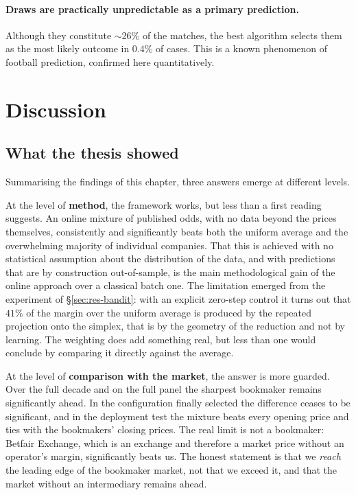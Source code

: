 \documentclass[12pt,a4paper,oneside]{report}
\renewcommand{\_}{\oldunderscore\allowbreak}
\theoremstyle{definition}
\theoremstyle{plain}
\theoremstyle{remark}
\begin{document}
\paragraph{Draws are practically unpredictable as a primary prediction.} Although they constitute
$\sim$26\% of the matches, the best algorithm selects them as the most likely outcome in $0.4\%$
of cases. This is a known phenomenon of football prediction, confirmed here quantitatively.

\section{Discussion}
\label{sec:discussion}

\subsection{What the thesis showed}

Summarising the findings of this chapter, three answers emerge at different levels.

At the level of \textbf{method}, the framework works, but less than a first reading suggests. An
online mixture of published odds, with no data beyond the prices themselves, consistently and
significantly beats both the uniform average and the overwhelming majority of individual
companies. That this is achieved with no statistical assumption about the distribution of the
data, and with predictions that are by construction out-of-sample, is the main methodological
gain of the online approach over a classical batch one. The limitation emerged from the
experiment of \S\ref{sec:res-bandit}: with an explicit zero-step control it turns out that $41\%$
of the margin over the uniform average is produced by the repeated projection onto the simplex,
that is by the geometry of the reduction and not by learning. The weighting does add something
real, but less than one would conclude by comparing it directly against the average.

At the level of \textbf{comparison with the market}, the answer is more guarded. Over the full
decade and on the full panel the sharpest bookmaker remains significantly ahead. In the
configuration finally selected the difference ceases to be significant, and in the deployment
test the mixture beats every opening price and ties with the bookmakers' closing prices. The real
limit is not a bookmaker: Betfair Exchange, which is an exchange and therefore a market price
without an operator's margin, significantly beats us. The honest statement is that we
\emph{reach} the leading edge of the bookmaker market, not that we exceed it, and that the market
without an intermediary remains ahead.
\end{document}
